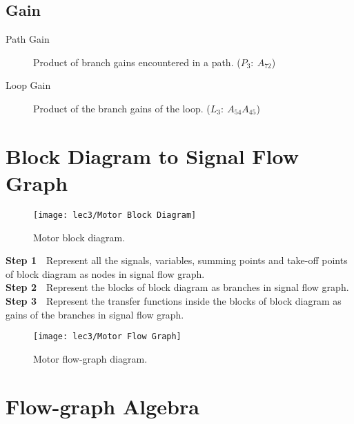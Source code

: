 \subsection{Gain}
	
\begin{description}
	\item[Path Gain]  Product of branch gains encountered in a path. ($P_3:\ A_{72}$)
	\item[Loop Gain]  Product of the branch gains of the loop. ($L_3:\ A_{54}A_{45}$)
\end{description}

\section[Block to Flow-graph]{Block Diagram to Signal Flow Graph}

\begin{figure}[h]
			\centering
			\texttt{[image: lec3/Motor Block Diagram]}
			\caption{Motor block diagram.}
\end{figure}

\textbf{Step 1}\ \  Represent all the signals, variables,
summing points and take-off points of block diagram as nodes in signal flow graph.\\
\textbf{Step 2}\ \  Represent the blocks of block diagram as branches in signal flow graph.\\
\textbf{Step 3}\ \  Represent the transfer functions inside the blocks of block diagram as 
gains of the branches in signal flow graph.\\[+2em]

\begin{figure}[h]
			\raggedleft
			\texttt{[image: lec3/Motor Flow Graph]}
			\caption{Motor flow-graph diagram.}
\end{figure}

\section[Flow-graph Algebra]{Flow-graph Algebra}


